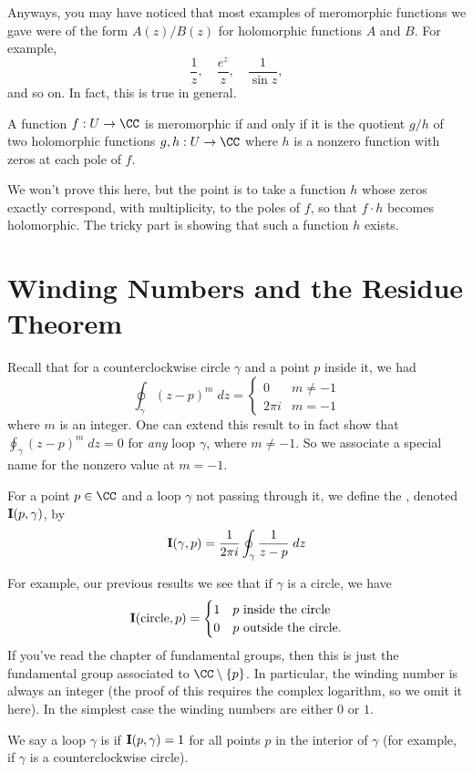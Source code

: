 \begin{definition}
Anyways, you may have noticed that most examples of meromorphic functions we gave
were of the form $A(z) / B(z)$ for holomorphic functions $A$ and $B$.
For example, \[ \frac 1z, \quad \frac{e^z}{z}, \quad \frac{1}{\sin z}, \] and so on.
In fact, this is true in general.
\begin{theorem}
	A function $f : U \to \CC$ is meromorphic
	if and only if it is the quotient $g/h$ of two holomorphic functions $g,h : U \to \CC$
	where $h$ is a nonzero function with zeros at each pole of $f$.
\end{theorem}
We won't prove this here, but the point is to take a function $h$ whose zeros exactly
correspond, with multiplicity, to the poles of $f$, so that $f \cdot h$ becomes holomorphic.
The tricky part is showing that such a function $h$ exists.

\section{Winding Numbers and the Residue Theorem}
Recall that for a counterclockwise circle $\gamma$ and a point $p$ inside it, we had
\[
	\oint_{\gamma} (z-p)^m \; dz =
	\begin{cases}
		0 & m \neq -1 \\
		2\pi i & m = -1
	\end{cases}
\]
where $m$ is an integer.
One can extend this result to in fact show that $\oint_\gamma (z-p)^m \; dz = 0$
for \emph{any} loop $\gamma$, where $m \neq -1$.
So we associate a special name for the nonzero value at $m=-1$.
\begin{definition}
	For a point $p \in \CC$ and a loop $\gamma$ not passing through it,
	we define the , denoted $\operatorname{\mathbf I}(p, \gamma)$, by
	\[
		\operatorname{\mathbf I}(\gamma, p) = \frac{1}{2\pi i} \oint_{\gamma} \frac{1}{z-p} \; dz
	\]
\end{definition}
For example, our previous results we see that if $\gamma$ is a circle, we have
\[
	\operatorname{\mathbf I}(\text{circle}, p)
	=
	\begin{cases}
		1 & \text{$p$ inside the circle} \\
		0 & \text{$p$ outside the circle}.
	\end{cases}
\]
If you've read the chapter of fundamental groups, then this is just the fundamental group
associated to $\CC \setminus \{p\}$.
In particular, the winding number is always an integer (the proof of this requires the complex logarithm,
so we omit it here).
In the simplest case the winding numbers are either $0$ or $1$.
\begin{definition}
	We say a loop $\gamma$ is  if $\operatorname{\mathbf I}(p, \gamma) = 1$
	for all points $p$ in the interior of $\gamma$ (for example,
	if $\gamma$ is a counterclockwise circle).
\end{definition}


\end{definition}
